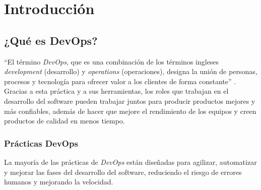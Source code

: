 \chapter{Introducción}

\section{¿Qué es DevOps?}

\enquote{El término \textit{DevOps}, que es una combinación de los términos ingleses \textit{development} (desarrollo) y \textit{operations} (operaciones), designa la unión de personas, procesos y tecnología para ofrecer valor a los clientes de forma constante} \cite{devops}. Gracias a esta práctica y a sus herramientas, los roles que trabajan en el desarrollo del software pueden trabajar juntos para producir productos mejores y más confiables, además de hacer que mejore el rendimiento de los equipos y creen productos de calidad en menos tiempo.

\subsection{Prácticas DevOps}

La mayoría de las prácticas de \textit{DevOps} están diseñadas para agilizar, automatizar y mejorar las fases del desarrollo del software, reduciendo el riesgo de errores humanos y mejorando la velocidad.


